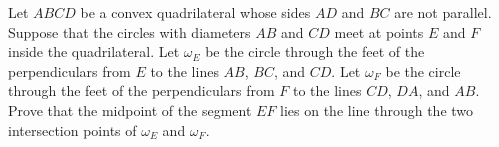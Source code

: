 Let $ABCD$ be a convex quadrilateral whose sides $AD$ and $BC$ are not parallel. Suppose that the circles with diameters $AB$ and $CD$ meet at points $E$ and $F$ inside the quadrilateral. Let $\omega_E$ be the circle through the feet of the perpendiculars from $E$ to the lines $AB$, $BC$, and $CD$. Let $\omega_F$ be the circle through the feet of the perpendiculars from $F$ to the lines $CD$, $DA$, and $AB$. Prove that the midpoint of the segment $EF$ lies on the line through the two intersection points of $\omega_E$ and $\omega_F$.
